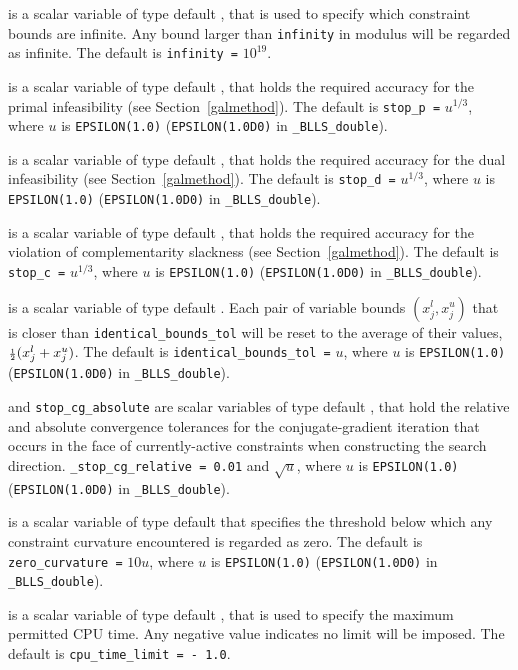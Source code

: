 \documentclass{galahad}
\newcommand{\packagename}{BLLS}
\newcommand{\fullpackagename}{\libraryname\_\packagename}
\begin{document}
\begin{description}
 is a scalar variable of type default \realdp, that is used to
specify which constraint bounds are infinite.
Any bound larger than {\tt infinity} in modulus will be regarded as infinite.
The default is {\tt infinity =} $10^{19}$.

 is a scalar variable of type default \realdp, that holds the
required accuracy for the primal infeasibility (see Section~\ref{galmethod}).
The default is {\tt stop\_p =} $u^{1/3}$,
where $u$ is {\tt EPSILON(1.0)} ({\tt EPSILON(1.0D0)} in
{\tt \fullpackagename\_double}).

 is a scalar variable of type default
\realdp, that holds the
required accuracy for the dual infeasibility (see Section~\ref{galmethod}).
The default is {\tt stop\_d =} $u^{1/3}$,
where $u$ is {\tt EPSILON(1.0)} ({\tt EPSILON(1.0D0)} in
{\tt \fullpackagename\_double}).

 is a scalar variable of type default
\realdp, that holds the
required accuracy for the violation of complementarity slackness
(see Section~\ref{galmethod}).
The default is {\tt stop\_c =} $u^{1/3}$,
where $u$ is {\tt EPSILON(1.0)} ({\tt EPSILON(1.0D0)} in
{\tt \fullpackagename\_double}).

is a scalar variable of type default \realdp.
Each pair of variable bounds $(x_{j}^{l}, x_{j}^{u})$
that is closer than {\tt identical\_bounds\_tol}
will be reset to the average of their values,
${\scriptstyle \frac{1}{2}} (x_{j}^{l} + x_{j}^{u})$.
The default is {\tt identical\_bounds\_tol =} $u$,
where $u$ is {\tt EPSILON(1.0)} ({\tt EPSILON(1.0D0)} in
{\tt \fullpackagename\_double}).

 and {\tt stop\_cg\_absolute}
are scalar variables of type default \realdp,
that hold the relative and absolute convergence tolerances for the
conjugate-gradient iteration that occurs in the face of currently-active
constraints when constructing the search direction.
{\tt \_stop\_cg\_relative = 0.01}
and  $\sqrt{u}$,
where $u$ is {\tt EPSILON(1.0)} ({\tt EPSILON(1.0D0)} in
{\tt \fullpackagename\_double}).

 is a scalar variable of type default \realdp
that specifies the threshold below which any constraint curvature
encountered is regarded as zero.
The default is {\tt zero\_curvature =} $10 u$,
where $u$ is {\tt EPSILON(1.0)} ({\tt EPSILON(1.0D0)} in
{\tt \fullpackagename\_double}).

 is a scalar variable of type default \realdp,
that is used to specify the maximum permitted CPU time. Any negative
value indicates no limit will be imposed. The default is
{\tt cpu\_time\_limit = - 1.0}.


\end{description}
\end{document}
